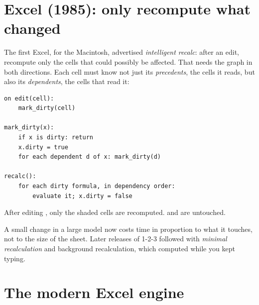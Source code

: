 \documentclass[11pt]{article}
\begin{document}
\section{Excel (1985): only recompute what changed}

The first Excel, for the Macintosh, advertised \emph{intelligent recalc}:
after an edit, recompute only the cells that could possibly be affected.
That needs the graph in both directions. Each cell must know not just its
\emph{precedents}, the cells it reads, but also its \emph{dependents}, the
cells that read it:

\begin{lstlisting}
on edit(cell):
    mark_dirty(cell)

mark_dirty(x):
    if x is dirty: return
    x.dirty = true
    for each dependent d of x: mark_dirty(d)

recalc():
    for each dirty formula, in dependency order:
        evaluate it; x.dirty = false
\end{lstlisting}

\begin{center}

{\small\sffamily\color{ink}After editing , only the shaded cells
are recomputed.  and  are untouched.}
\end{center}

A small change in a large model now costs time in proportion to what it
touches, not to the size of the sheet. Later releases of 1-2-3 followed
with \emph{minimal recalculation} and background recalculation, which
computed while you kept typing.

\section{The modern Excel engine}
\end{document}
